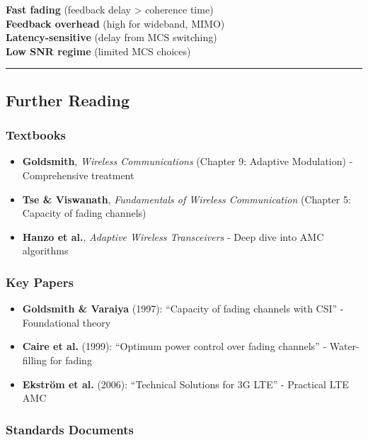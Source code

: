 \textbf{Fast fading} (feedback delay \textgreater{} coherence time)\\
\textbf{Feedback overhead} (high for wideband, MIMO)\\
\textbf{Latency-sensitive} (delay from MCS switching)\\
\textbf{Low SNR regime} (limited MCS choices)

\begin{center}\rule{0.5\linewidth}{0.5pt}\end{center}

\subsection{\texorpdfstring{ Further
Reading}{ Further Reading}}\label{further-reading}

\subsubsection{Textbooks}\label{textbooks}

\begin{itemize}
\tightlist
\item
  \textbf{Goldsmith}, \emph{Wireless Communications} (Chapter 9:
  Adaptive Modulation) - Comprehensive treatment
\item
  \textbf{Tse \& Viswanath}, \emph{Fundamentals of Wireless
  Communication} (Chapter 5: Capacity of fading channels)
\item
  \textbf{Hanzo et al.}, \emph{Adaptive Wireless Transceivers} - Deep
  dive into AMC algorithms
\end{itemize}

\subsubsection{Key Papers}\label{key-papers}

\begin{itemize}
\tightlist
\item
  \textbf{Goldsmith \& Varaiya} (1997): ``Capacity of fading channels
  with CSI'' - Foundational theory
\item
  \textbf{Caire et al.} (1999): ``Optimum power control over fading
  channels'' - Water-filling for fading
\item
  \textbf{Ekström et al.} (2006): ``Technical Solutions for 3G LTE'' -
  Practical LTE AMC
\end{itemize}

\subsubsection{Standards Documents}\label{standards-documents}


